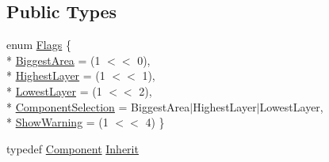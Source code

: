 \subsection*{Public Types}
\begin{DoxyCompactItemize}
\item 
enum \hyperlink{classHurricane_1_1RoutingPad_a69f37f0b06b9bfd758d9be42c71e2bd4}{Flags} \{ \\*
\hyperlink{classHurricane_1_1RoutingPad_a69f37f0b06b9bfd758d9be42c71e2bd4add72642d150e901835fa7d66d40e327d}{Biggest\-Area} = (1 $<$$<$ 0), 
\\*
\hyperlink{classHurricane_1_1RoutingPad_a69f37f0b06b9bfd758d9be42c71e2bd4a8f7993760a105713a97abdfb05eee852}{Highest\-Layer} = (1 $<$$<$ 1), 
\\*
\hyperlink{classHurricane_1_1RoutingPad_a69f37f0b06b9bfd758d9be42c71e2bd4a14c89f0c4ca6f4108b7f2ac30ab885a6}{Lowest\-Layer} = (1 $<$$<$ 2), 
\\*
\hyperlink{classHurricane_1_1RoutingPad_a69f37f0b06b9bfd758d9be42c71e2bd4aa2db526191b29a7e094bff309e27ef4c}{Component\-Selection} = Biggest\-Area$|$\-Highest\-Layer$|$\-Lowest\-Layer, 
\\*
\hyperlink{classHurricane_1_1RoutingPad_a69f37f0b06b9bfd758d9be42c71e2bd4a8fd74358022a29aab828700c8f7347ba}{Show\-Warning} = (1 $<$$<$ 4)
 \}
\item 
typedef \hyperlink{classHurricane_1_1Component}{Component} \hyperlink{classHurricane_1_1RoutingPad_a53bed3713fe846a351621d2022bc6b68}{Inherit}
\end{DoxyCompactItemize}
